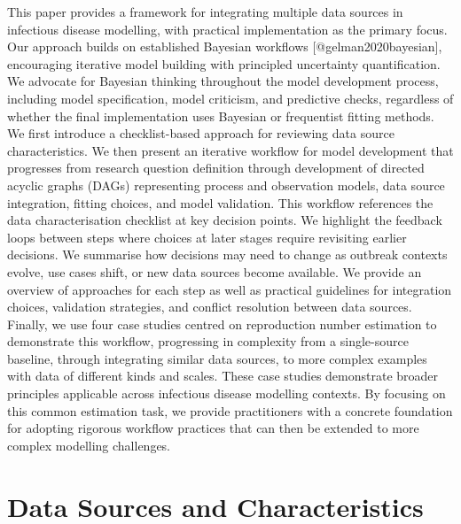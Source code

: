 \documentclass{article}
\begin{document}
This paper provides a framework for integrating multiple data sources in infectious disease modelling, with practical implementation as the primary focus. 
Our approach builds on established Bayesian workflows [@gelman2020bayesian], encouraging iterative model building with principled uncertainty quantification. We advocate for Bayesian thinking throughout the model development process, including model specification, model criticism, and predictive checks, regardless of whether the final implementation uses Bayesian or frequentist fitting methods. 
We first introduce a checklist-based approach for reviewing data source characteristics. 
We then present an iterative workflow for model development that progresses from research question definition through development of directed acyclic graphs (DAGs) representing process and observation models, data source integration, fitting choices, and model validation. 
This workflow references the data characterisation checklist at key decision points. We highlight the feedback loops between steps where choices at later stages require revisiting earlier decisions. 
We summarise how decisions may need to change as outbreak contexts evolve, use cases shift, or new data sources become available. 
We provide an overview of approaches for each step as well as practical guidelines for integration choices, validation strategies, and conflict resolution between data sources. 
Finally, we use four case studies centred on reproduction number estimation to demonstrate this workflow, progressing in complexity from a single-source baseline, through integrating similar data sources, to more complex examples with data of different kinds and scales. 
These case studies demonstrate broader principles applicable across infectious disease modelling contexts. 
By focusing on this common estimation task, we provide practitioners with a concrete foundation for adopting rigorous workflow practices that can then be extended to more complex modelling challenges.

\section{Data Sources and Characteristics} \label{sec:datareview}

\end{document}
